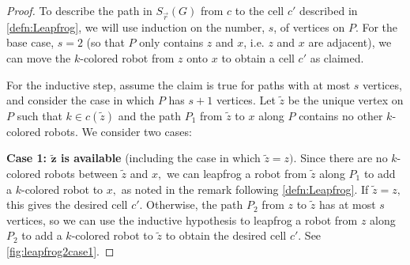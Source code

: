\documentclass{amsart}
\newcommand{\Sr}{S_{\vec{r}}}
\theoremstyle{definition}
\theoremstyle{remark}
\begin{document}
\begin{proof}
    To describe the path in $\Sr(G)$ from $c$ to the cell $c'$ described in \cref{defn:Leapfrog}, we will use induction on the number, $s$, of vertices on $P$. For the base case, $s=2$ (so that $P$ only contains $z$ and $x$, i.e. $z$ and $x$ are adjacent), we can move the $k$-colored robot from $z$ onto $x$ to obtain a cell $c'$ as claimed.

    For the inductive step, assume the claim is true for paths with at most $s$ vertices, and consider the case in which $P$ has $s+1$ vertices. Let $\tilde z$ be the unique vertex on $P$ such that $k\in c(\tilde z)$ and the path $P_1$ from $\tilde z$ to $x$ along $P$ contains no other $k$-colored robots. We consider two cases:

    \textbf{Case 1: $\boldsymbol{\tilde z}$ is available} (including the case in which $\tilde z=z).$ Since there are no $k$-colored robots between $\tilde z$ and $x,$ we can leapfrog a robot from $\tilde z$ along $P_1$ to add a $k$-colored robot to $x,$ as noted in the remark following \cref{defn:Leapfrog}. If $\tilde z=z,$ this gives the desired cell $c'$. Otherwise, the path $P_2$ from $z$ to $\tilde z$ has at most $s$ vertices, so we can use the inductive hypothesis to leapfrog a robot from $z$ along $P_2$ to add a $k$-colored robot to $\tilde z$ to obtain the desired cell $c'.$ See \cref{fig:leapfrog2case1}.


\end{proof}
\end{document}

